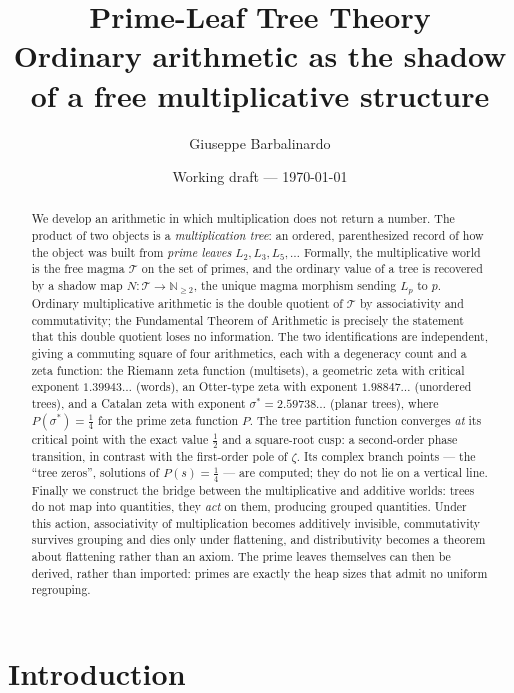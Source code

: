 \documentclass[11pt]{article}
\title{Prime-Leaf Tree Theory\\[2mm]
\large Ordinary arithmetic as the shadow of a free multiplicative structure}
\author{Giuseppe Barbalinardo}
\date{Working draft --- \today}
\newcommand{\cT}{\mathcal{T}}   %
\newcommand{\NN}{\mathbb{N}}
\numberwithin{equation}{section}
\theoremstyle{plain}
\theoremstyle{definition}
\theoremstyle{remark}
\begin{document}
\maketitle

\begin{abstract}
We develop an arithmetic in which multiplication does not return a number.
The product of two objects is a \emph{multiplication tree}: an ordered, parenthesized
record of how the object was built from \emph{prime leaves} $L_2, L_3, L_5, \dots$
Formally, the multiplicative world is the free magma $\cT$ on the set of primes, and
the ordinary value of a tree is recovered by a shadow map $N \colon \cT \to \NN_{\ge 2}$,
the unique magma morphism sending $L_p$ to $p$. Ordinary multiplicative arithmetic is
the double quotient of $\cT$ by associativity and commutativity; the Fundamental
Theorem of Arithmetic is precisely the statement that this double quotient loses no
information. The two identifications are independent, giving a commuting square of four
arithmetics, each with a degeneracy count and a zeta function: the Riemann zeta function
(multisets), a geometric zeta with critical exponent $1.39943\dots$ (words), an
Otter-type zeta with exponent $1.98847\dots$ (unordered trees), and a Catalan zeta with
exponent $\sigma^{*} = 2.59738\dots$ (planar trees), where $P(\sigma^{*}) = \tfrac14$ for
the prime zeta function $P$. The tree partition function converges \emph{at} its critical
point with the exact value $\tfrac12$ and a square-root cusp: a second-order phase
transition, in contrast with the first-order pole of $\zeta$. Its complex branch points
--- the ``tree zeros'', solutions of $P(s) = \tfrac14$ --- are computed; they do not lie
on a vertical line. Finally we construct the bridge between the multiplicative and
additive worlds: trees do not map into quantities, they \emph{act} on them, producing
grouped quantities. Under this action, associativity of multiplication becomes
additively invisible, commutativity survives grouping and dies only under flattening,
and distributivity becomes a theorem about flattening rather than an axiom. The prime
leaves themselves can then be derived, rather than imported: primes are exactly the heap
sizes that admit no uniform regrouping.
\end{abstract}

\tableofcontents

\section{Introduction}
\end{document}
